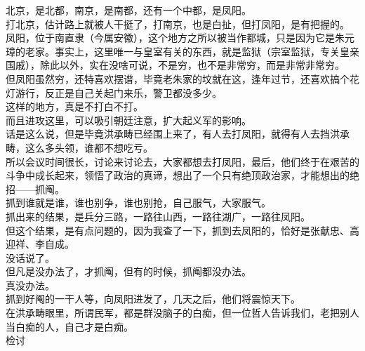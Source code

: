 \begin{multicols}{\theparacolNo}
北京，是北都，南京，是南都，还有一个中都，是凤阳。\\

打北京，估计路上就被人干挺了，打南京，也是白扯，但打凤阳，是有把握的。\\

凤阳，位于南直隶（今属安徽），这个地方之所以被当作都城，只是因为它是朱元璋的老家。事实上，这里唯一与皇室有关的东西，就是监狱（宗室监狱，专关皇亲国戚），除此以外，实在没啥可说，不是穷，也不是非常穷，而是非常非常穷。\\

但凤阳虽然穷，还特喜欢摆谱，毕竟老朱家的坟就在这，逢年过节，还喜欢搞个花灯游行，反正是自己关起门来乐，警卫都没多少。\\

这样的地方，真是不打白不打。\\

而且进攻这里，可以吸引朝廷注意，扩大起义军的影响。\\

话是这么说，但是毕竟洪承畴已经围上来了，有人去打凤阳，就得有人去挡洪承畴，这么多头领，谁都不想吃亏。\\

所以会议时间很长，讨论来讨论去，大家都想去打凤阳，最后，他们终于在艰苦的斗争中成长起来，领悟了政治的真谛，想出了一个只有绝顶政治家，才能想出的绝招——抓阄。\\

抓到谁就是谁，谁也别争，谁也别抢，自己服气，大家服气。\\

抓出来的结果，是兵分三路，一路往山西，一路往湖广，一路往凤阳。\\

但这个结果，是有点问题的，因为我查了一下，抓到去凤阳的，恰好是张献忠、高迎祥、李自成。\\

没话说了。\\

但凡是没办法了，才抓阄，但有的时候，抓阄都没办法。\\

真没办法。\\

抓到好阄的一干人等，向凤阳进发了，几天之后，他们将震惊天下。\\

在洪承畴眼里，所谓民军，都是群没脑子的白痴，但一位哲人告诉我们，老把别人当白痴的人，自己才是白痴。\\

检讨\\


\end{multicols}
